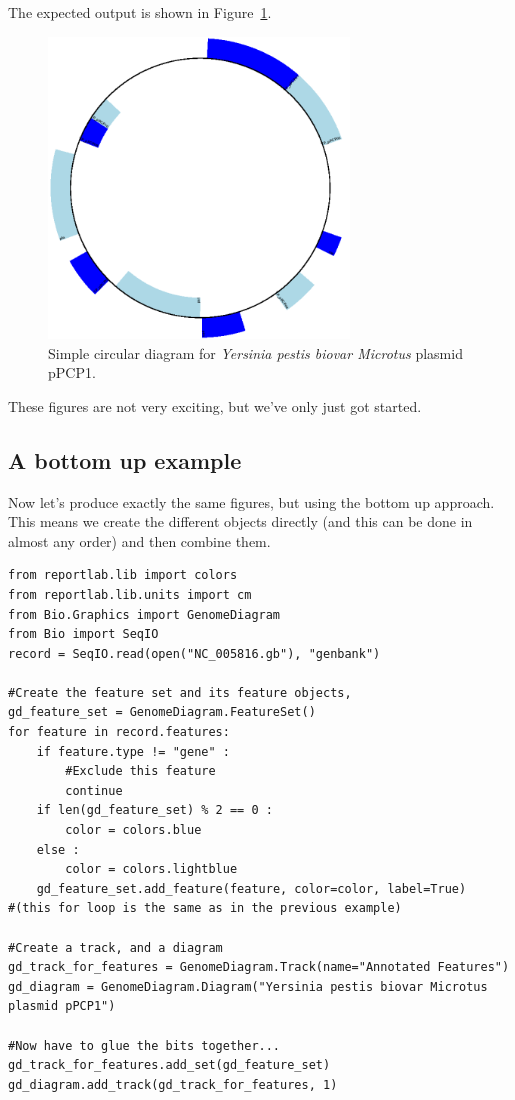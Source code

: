 \documentclass{report}
\begin{document}
\begin{htmlonly}

\end{htmlonly}
\begin{latexonly}
The expected output is shown in Figure~\ref{fig:plasmid_circular}.
\begin{figure}[htbp]
\centering
\includegraphics[width=8cm,height=8cm]{images/plasmid_circular.png}
\caption{Simple circular diagram for \textit{Yersinia pestis biovar Microtus} plasmid pPCP1.}
\label{fig:plasmid_circular}
\end{figure}
\end{latexonly}
These figures are not very exciting, but we've only just got started.

\subsection{A bottom up example}
Now let's produce exactly the same figures, but using the bottom up approach.
This means we create the different objects directly (and this can be done in
almost any order) and then combine them.

\begin{verbatim}
from reportlab.lib import colors
from reportlab.lib.units import cm
from Bio.Graphics import GenomeDiagram
from Bio import SeqIO
record = SeqIO.read(open("NC_005816.gb"), "genbank")

#Create the feature set and its feature objects,
gd_feature_set = GenomeDiagram.FeatureSet()
for feature in record.features:
    if feature.type != "gene" :
        #Exclude this feature
        continue
    if len(gd_feature_set) % 2 == 0 :
        color = colors.blue
    else :
        color = colors.lightblue
    gd_feature_set.add_feature(feature, color=color, label=True)
#(this for loop is the same as in the previous example)

#Create a track, and a diagram
gd_track_for_features = GenomeDiagram.Track(name="Annotated Features")
gd_diagram = GenomeDiagram.Diagram("Yersinia pestis biovar Microtus plasmid pPCP1")

#Now have to glue the bits together...
gd_track_for_features.add_set(gd_feature_set)
gd_diagram.add_track(gd_track_for_features, 1)
\end{verbatim}
\end{document}
